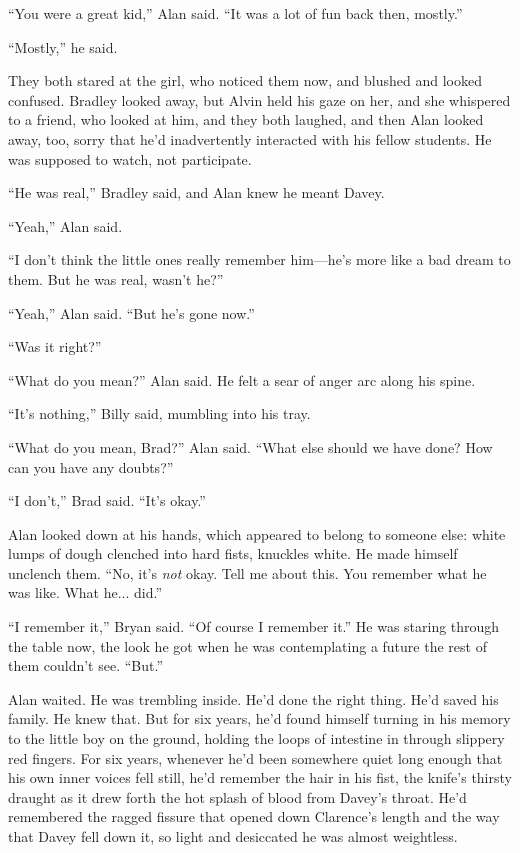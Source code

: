 ``You were a great kid,'' Alan said.  ``It was a lot of fun back then,
mostly.''

``Mostly,'' he said.

They both stared at the girl, who noticed them now, and blushed and
looked confused.  Bradley looked away, but Alvin held his gaze on her,
and she whispered to a friend, who looked at him, and they both
laughed, and then Alan looked away, too, sorry that he'd inadvertently
interacted with his fellow students.  He was supposed to watch, not
participate.

``He was real,'' Bradley said, and Alan knew he meant Davey.

``Yeah,'' Alan said.

``I don't think the little ones really remember him---he's more like a
bad dream to them.  But he was real, wasn't he?''

``Yeah,'' Alan said.  ``But he's gone now.''

``Was it right?''

``What do you mean?'' Alan said.  He felt a sear of anger arc along
his spine.

``It's nothing,'' Billy said, mumbling into his tray.

``What do you mean, Brad?'' Alan said.  ``What else should we have
done?  How can you have any doubts?''

``I don't,'' Brad said.  ``It's okay.''

Alan looked down at his hands, which appeared to belong to someone
else:  white lumps of dough clenched into hard fists, knuckles white. 
He made himself unclench them.  ``No, it's \textit{not} okay.  Tell me
about this.  You remember what he was like.  What he...  did.''

``I remember it,'' Bryan said.  ``Of course I remember it.'' He was
staring through the table now, the look he got when he was
contemplating a future the rest of them couldn't see.  ``But.''

Alan waited.  He was trembling inside.  He'd done the right thing. 
He'd saved his family.  He knew that.  But for six years, he'd found
himself turning in his memory to the little boy on the ground, holding
the loops of intestine in through slippery red fingers.  For six
years, whenever he'd been somewhere quiet long enough that his own
inner voices fell still, he'd remember the hair in his fist, the
knife's thirsty draught as it drew forth the hot splash of blood from
Davey's throat.  He'd remembered the ragged fissure that opened down
Clarence's length and the way that Davey fell down it, so light and
desiccated he was almost weightless.

